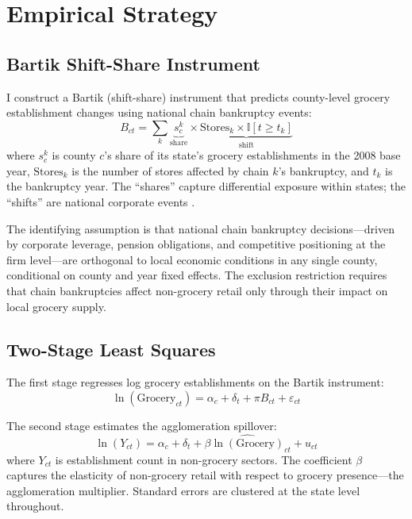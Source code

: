 \documentclass[12pt]{article}
\newcommand{\ind}{\mathbb{I}}
\begin{document}
\section{Empirical Strategy}
\label{sec:strategy}

\subsection{Bartik Shift-Share Instrument}

I construct a Bartik (shift-share) instrument that predicts county-level grocery establishment changes using national chain bankruptcy events:
\begin{equation}
\label{eq:bartik}
B_{ct} = \sum_{k} \underbrace{s_{c}^{k}}_{\text{share}} \times \underbrace{\text{Stores}_{k} \times \ind[t \geq t_k]}_{\text{shift}}
\end{equation}
where $s_{c}^{k}$ is county $c$'s share of its state's grocery establishments in the 2008 base year, $\text{Stores}_{k}$ is the number of stores affected by chain $k$'s bankruptcy, and $t_k$ is the bankruptcy year. The ``shares'' capture differential exposure within states; the ``shifts'' are national corporate events \citep{goldsmith2020bartik, borusyak2022quasi}.

The identifying assumption is that national chain bankruptcy decisions---driven by corporate leverage, pension obligations, and competitive positioning at the firm level---are orthogonal to local economic conditions in any single county, conditional on county and year fixed effects. The exclusion restriction requires that chain bankruptcies affect non-grocery retail only through their impact on local grocery supply.

\subsection{Two-Stage Least Squares}

The first stage regresses log grocery establishments on the Bartik instrument:
\begin{equation}
\label{eq:fs}
\ln(\text{Grocery}_{ct}) = \alpha_c + \delta_t + \pi B_{ct} + \varepsilon_{ct}
\end{equation}

The second stage estimates the agglomeration spillover:
\begin{equation}
\label{eq:ss}
\ln(Y_{ct}) = \alpha_c + \delta_t + \beta \widehat{\ln(\text{Grocery})}_{ct} + u_{ct}
\end{equation}
where $Y_{ct}$ is establishment count in non-grocery sectors. The coefficient $\beta$ captures the elasticity of non-grocery retail with respect to grocery presence---the agglomeration multiplier. Standard errors are clustered at the state level throughout.
\end{document}
